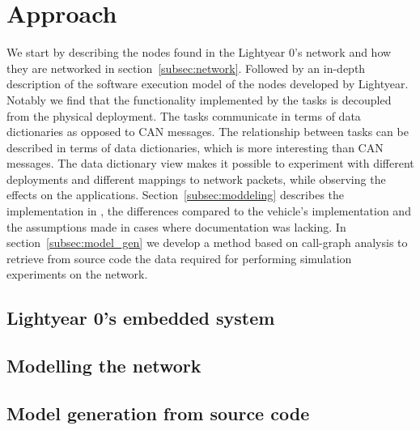 \section{Approach}
\label{sec:approach}
We start by describing the nodes found in the Lightyear 0's network and how they are networked in section~\ref{subsec:network}. Followed by an in-depth description of the software execution model of the nodes developed by Lightyear. Notably we find that the functionality implemented by the tasks is decoupled from the physical deployment. The tasks communicate in terms of data dictionaries as opposed to CAN messages. The relationship between tasks can be described in terms of data dictionaries, which is more interesting than CAN messages. The data dictionary view makes it possible to experiment with different deployments and different mappings to network packets, while observing the effects on the applications. Section~\ref{subsec:moddeling} describes the implementation in \omnet, the differences compared to the vehicle's implementation and the assumptions made in cases where documentation was lacking. In section~\ref{subsec:model_gen} we develop a method based on call-graph analysis to retrieve from source code the data required for performing simulation experiments on the network.

\subsection{Lightyear 0's embedded system}

\newpage
\subsection{Modelling the network}


\subsection{Model generation from source code}
